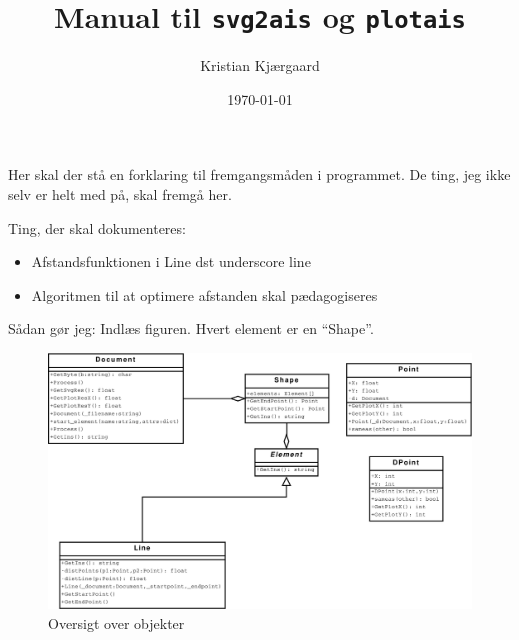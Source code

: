 \documentclass{mypaper}
\title{Manual til \texttt{svg2ais} og \texttt{plotais}}
\author{Kristian Kjærgaard}
\date{\today}
\begin{document}
\maketitle

Her skal der stå en forklaring til fremgangsmåden i programmet. De
ting, jeg ikke selv er helt med på, skal fremgå her.

Ting, der skal dokumenteres:

\begin{itemize}
\item Afstandsfunktionen i Line dst underscore line
\item Algoritmen til at optimere afstanden skal pædagogiseres
\end{itemize}

Sådan gør jeg: Indlæs figuren. Hvert element er en ``Shape''.

\begin{figure}[htbp]
  \centering
  \includegraphics[width=\textwidth]{./obj-oversigt}
  \caption{Oversigt over objekter}
  \label{fig:obj-oversigt}
\end{figure}
\end{document}
